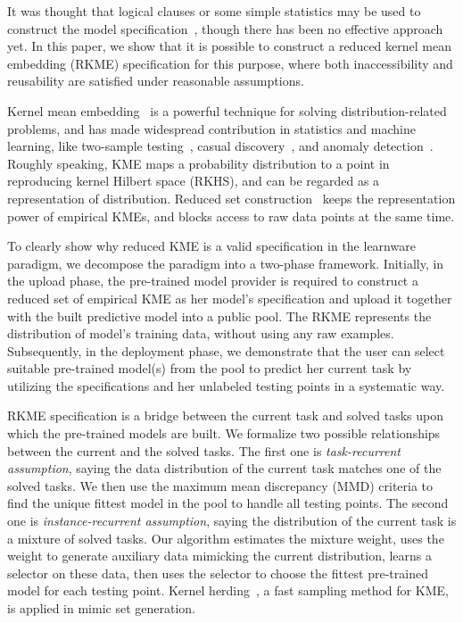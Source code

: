 \documentclass[paper=letter, fontsize=20pt]{article}
\begin{document}
It was thought that logical clauses or some simple statistics may be used to construct the model specification~\citep{learnware}, though there has been no effective approach yet. In this paper, we show that it is possible to construct a reduced kernel mean embedding (RKME) specification for this purpose, where both inaccessibility and reusability are satisfied under reasonable assumptions.

Kernel mean embedding~\citep{KME_survey} is a powerful technique for solving distribution-related problems, and has made widespread contribution in statistics and machine learning, like two-sample testing~\citep{Interpretable_TSS}, casual discovery~\citep{KME_casual}, and anomaly detection~\citep{KME_anomaly}. Roughly speaking, KME maps a probability distribution to a point i{}n reproducing kernel Hilbert space (RKHS), and can be regarded as a representation of distribution. Reduced set construction~\citep{TNN99_RS} keeps the representation power of empirical KMEs, and blocks access to raw data points at the same time.

To clearly show why reduced KME is a valid specification in the learnware paradigm, we decompose the paradigm into a two-phase framework. Initially, in the upload phase, the pre-trained model provider is required to construct a reduced set of empirical KME as her model's specification and upload it together with the built predictive model into a public pool. The RKME represents the distribution of model's training data, without using any raw examples. Subsequently, in the deployment phase, we demonstrate that the user can select suitable pre-trained model(s) from the pool to predict her current task by utilizing the specifications and her unlabeled testing points in a systematic way.

RKME specification is a bridge between the current task and solved tasks upon which the pre-trained models are built. We formalize two possible relationships between the current and the solved tasks. The first one is \emph{task-recurrent assumption}, saying the data distribution of the current task matches one of the solved tasks. We then use the maximum mean discrepancy (MMD) criteria to find the unique fittest model in the pool to handle all testing points. The second one is \emph{instance-recurrent assumption}, saying the distribution of the current task is a mixture of solved tasks. Our algorithm estimates the mixture weight, uses the weight to generate auxiliary data mimicking the current distribution, learns a selector on these data, then uses the selector to choose the fittest pre-trained model for each testing point. Kernel herding~\citep{herding_thesis}, a fast sampling method for KME, is applied in mimic set generation.
\end{document}
